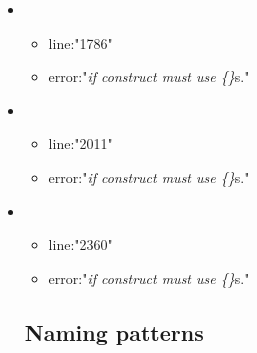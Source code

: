 \begin{itemize}
\begin{itemize}
	\end{itemize}
	\item 
	\begin{itemize} 
		\item line:"1786" 
		\item error:"\emph{if construct must use \{\}}s." 
	\end{itemize}
	\item 
	\begin{itemize} 
		\item line:"2011" 
		\item error:"\emph{if construct must use \{\}}s." 
	\end{itemize}
	\item 
	\begin{itemize} 
		\item line:"2360" 
		\item error:"\emph{if construct must use \{\}}s."
	\end{itemize}
\subsection{Naming patterns} %
\label{sub:naming_patterns}



\end{itemize}
